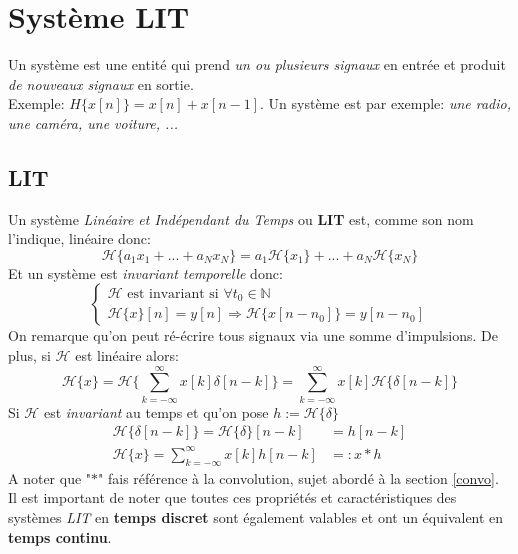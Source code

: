 \documentclass{report}
\begin{document}
\chapter{Système LIT}
Un système est une entité qui prend \textit{un ou plusieurs signaux} en entrée et produit \textit{de nouveaux signaux} en sortie.\\
Exemple: $H\{x[n]\} = x[n] + x[n-1]$. Un système est par exemple: \textit{une radio, une caméra, une voiture, ...}

\section{LIT}
Un système \textit{Linéaire et Indépendant du Temps} ou \textbf{LIT} est, comme son nom l'indique, linéaire donc:
\begin{equation}
\mathcal{H}\{a_1x_1 + ... + a_Nx_N\} = a_1\mathcal{H}\{x_1\} + ... + a_N\mathcal{H}\{x_N\} 
\end{equation}
Et un système est \textit{invariant temporelle} donc:
\begin{equation}
\begin{cases}
\mathcal{H} \text{ est invariant si } \forall t_0 \in \mathbb{N}\\
\mathcal{H}\{x\}[n] = y[n] \Rightarrow \mathcal{H}\{x[n-n_0]\} = y[n-n_0]
\end{cases}
\end{equation}
On remarque qu'on peut ré-écrire tous signaux via une somme d'impulsions. De plus, si $\mathcal{H}$ est linéaire alors:
\begin{equation}
\mathcal{H}\{x\} = \mathcal{H}\biggl\{\sum_{k= -\infty}^{\infty} x[k]\delta[n-k] \biggl\} = \sum_{k=-\infty}^{\infty} x[k]\mathcal{H}\{\delta[n-k]\}
\end{equation}
Si $\mathcal{H}$ est \textit{invariant} au temps et qu'on pose $h := \mathcal{H}\{\delta\}$
\begin{align}
\mathcal{H}\{\delta[n-k]\} = \mathcal{H}\{\delta\}[n-k] &= h[n-k]\\
\mathcal{H}\{x\} = \sum_{k=-\infty}^{\infty} x[k]h[n-k] &=: x \ast h
\end{align}
A noter que "$\ast$" fais référence à la convolution, sujet abordé à la section \ref{convo}.\\

Il est important de noter que toutes ces propriétés et caractéristiques des systèmes \textit{LIT} en \textbf{temps discret} sont également valables et ont un équivalent en \textbf{temps continu}.
\end{document}
